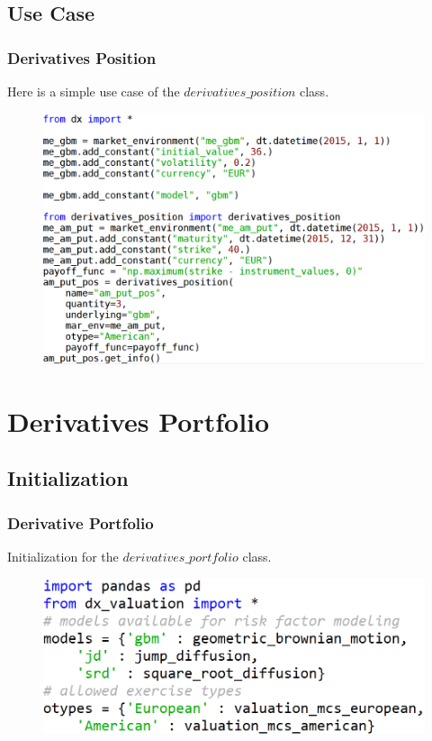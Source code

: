 \documentclass{beamer}
\begin{document}
\subsection{Use Case}
\begin{frame}
\frametitle{Derivatives Position}
Here is a simple use case of the $derivatives\_position$ class.
\begin{figure}[H]
	\includegraphics[scale=0.37]{derivatives_position_use_case.png}
\end{figure}
\end{frame}

\section{Derivatives Portfolio}
\subsection{Initialization}
\begin{frame}
\frametitle{Derivative Portfolio}
Initialization for the $derivatives\_portfolio$ class.
\begin{figure}
	\includegraphics[scale=0.45]{derivatives_portfolio_init.png}
\end{figure}
\end{frame}
\end{document}

